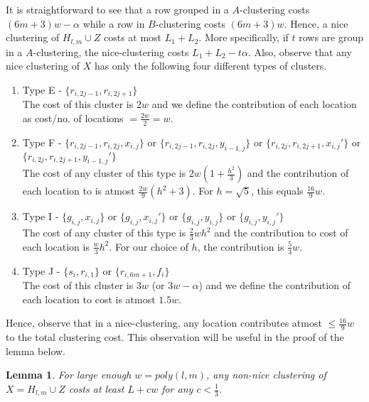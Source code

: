 \documentclass{article}
\newtheorem{lemma}[theorem]{Lemma}
\begin{document}
It is straightforward to see that a row grouped in a $A$-clustering costs $(6m+3)w-\alpha$ while a row in $B$-clustering costs $(6m+3)w$. Hence, a nice clustering of $H_{l,m} \cup Z$ costs at most $L_1 + L_2$. More specifically, if $t$ rows are group in a $A$-clustering, the nice-clustering costs $L_1+L_2-t\alpha$. Also, observe that any nice clustering of $X$ has only the following four different types of clusters. \begin{enumerate}[label=(\arabic*),nolistsep,leftmargin=*]
\item Type E - $\{r_{i,2j-1}, r_{i,2j+1}\}$ \\
The cost of this cluster is $2w$ and we define the contribution of each location as  cost/no. of locations $ = \frac{2w}{2} = w$.
\item Type F - $\{r_{i,2j-1}, r_{i, 2j}, x_{i, j}\}$ or $\{r_{i,2j-1}, r_{i, 2j}, y_{i-1, j}\}$ or $\{r_{i,2j}, r_{i, 2j+1}, x_{i, j}'\}$ or $\{r_{i,2j}, r_{i, 2j+1}, y_{i-1, j}'\}$\\
The cost of any cluster of this type is $2w(1+\frac{h^2}{3})$ and the contribution of each location to is atmost $\frac{2w}{9}(h^2+3)$. For $h = \sqrt 5$, this equals $\frac{16}{9}w$.  
\item Type I - $\{g_{i, j}, x_{i,j}\}$ or $\{g_{i, j}, x_{i,j}'\}$  or $\{g_{i, j}, y_{i,j}\}$  or $\{g_{i, j}, y_{i,j}'\}$\\
The cost of any cluster of this type is $\frac{2}{3}wh^2$ and the contribution to cost of each location is $\frac{w}{3}h^2$. For our choice of $h$, the contribution is $\frac{5}{3}w$.
\item Type J - $\{s_i, r_{i,1}\}$ or $\{r_{i,6m+1}, f_i\}$\\
The cost of this cluster is $3w$ (or $3w-\alpha$) and we define the contribution of each location to cost is atmost $1.5w$. 
\end{enumerate}
Hence, observe that in a nice-clustering, any location contributes atmost $\le \frac{16}{9}w$ to the total clustering cost. This observation will be useful in the proof of the lemma below.

\begin{lemma}
For large enough $w = poly(l, m)$, any non-nice clustering of $X = H_{l, m} \cup Z$ costs at least $L + cw$ for any $c < \frac{1}{3}$.
\end{lemma}
\end{document}
